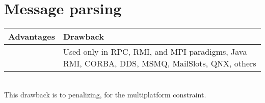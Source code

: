 \section{Message parsing}

\begin{tabular}{|p{}||p{}|}
\hline
  \textbf{Advantages}&\textbf{Drawback}\\
\hline
&Used only in RPC, RMI, and MPI paradigms, Java RMI, CORBA, DDS, MSMQ, MailSlots, QNX, others\\
\hline
\end{tabular}
~\\

This drawback is to penalizing, for the multiplatform constraint.








